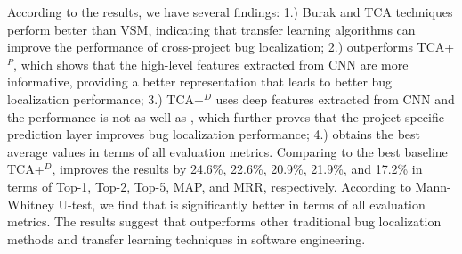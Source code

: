 According to the results, we have several findings: 1.) Burak and TCA techniques perform better than VSM, indicating that transfer learning algorithms can improve the performance of cross-project bug localization; 2.) \TRANPCNN outperforms TCA+$^P$, which shows that the high-level features extracted from CNN are more informative, providing a better representation that leads to better bug localization performance; 3.) TCA+$^D$ uses deep features extracted from CNN and the performance is not as well as \TRANPCNN, which further proves that the project-specific prediction layer improves bug localization performance; 4.) \TRANPCNN obtains the best average values in terms of all evaluation metrics. Comparing to the best baseline TCA+$^{D}$, \TRANPCNN improves the results by 24.6\%, 22.6\%, 20.9\%, 21.9\%, and 17.2\% in terms of Top-1, Top-2, Top-5, MAP, and MRR, respectively. According to Mann-Whitney U-test, we find that \TRANPCNN is significantly better in terms of all evaluation metrics. The results suggest that \TRANPCNN outperforms other traditional bug localization methods and transfer learning techniques in software engineering.


